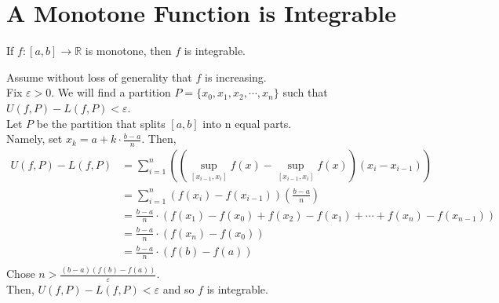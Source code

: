 \documentclass[12pt]{article}
\begin{document}
\section{A Monotone Function is Integrable}
\begin{theo}{}
If \(f:[a, b] \to \mathbb R\) is monotone, then \(f\) is integrable.    
\end{theo}
\begin{prf}{}
Assume without loss of generality that \(f\) is increasing.\\
Fix \(\varepsilon > 0\). We will find a partition \(P = \{x_0, x_1, x_2, \cdots, x_n\}\) such that \(U(f, P) - L(f, P) < \varepsilon\).\\
Let \(P\) be the partition that splits \([a, b]\) into n equal parts.\\
Namely, set \(x_k = a+ k\cdot \frac{b-a}{n}\). Then,
\begin{align*}
    U(f, P) - L(f, P) &= \displaystyle\sum_{i=1}^n\left(\left(\displaystyle\sup_{[x_{i-1}, x_i]}f(x) - \displaystyle\sup_{[x_{i-1}, x_i]}f(x)\right)\left(x_{i} - x_{i-1}\right)\right)\\
    &= \displaystyle\sum_{i=1}^n\left(f(x_i)-f(x_{i-1})\right)\left(\frac{b - a}{n}\right)\\
    &= \frac{b - a}{n}\cdot \left(f(x_1) - f(x_0) + f(x_2) - f(x_1) + \cdots + f(x_n) - f(x_{n-1})\right)\\
    &= \frac{b - a}{n}\cdot \left(f(x_n) - f(x_0)\right)\\
    &= \frac{b - a}{n}\cdot \left(f(b) - f(a)\right)\\
\end{align*}    
Chose \(n > \frac{(b - a)(f(b) - f(a))}{\varepsilon}\).\\
Then, \(U(f, P) - L(f, P) < \varepsilon\) and so \(f\) is integrable.
\end{prf}
\end{document}
